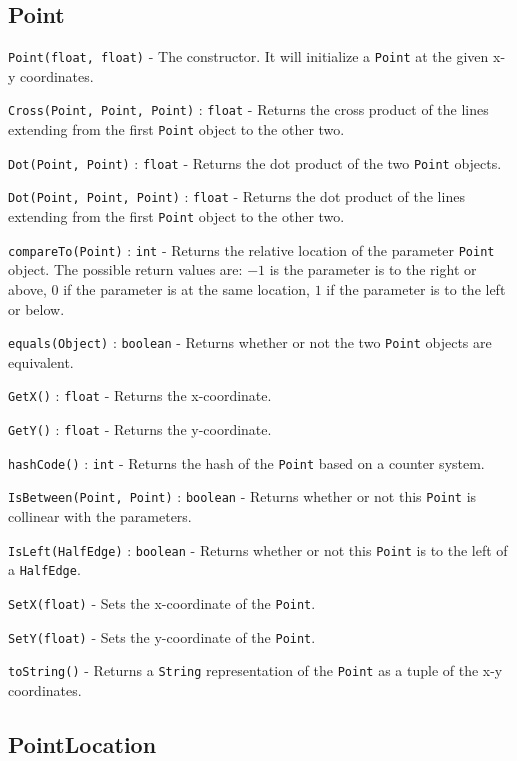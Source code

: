 \documentclass[11pt]{article}
\begin{document}
\subsection{Point}
\label{sec:point}

\texttt{Point(float, float)} - The constructor. It will initialize a \texttt{Point} at the given x-y coordinates.

\texttt{Cross(Point, Point, Point)} : \texttt{float} - Returns the cross product of the lines extending from the first \texttt{Point} object to the other two.

\texttt{Dot(Point, Point)}  : \texttt{float} - Returns the dot product of the two \texttt{Point} objects.

\texttt{Dot(Point, Point, Point)} : \texttt{float} - Returns the dot product of the lines extending from the first \texttt{Point} object to the other two.

\texttt{compareTo(Point)} : \texttt{int} - Returns the relative location of the parameter \texttt{Point} object. The possible return values are: $-1$ is the parameter is to the right or above, $0$ if the parameter is at the same location, $1$ if the parameter is to the left or below.

\texttt{equals(Object)} : \texttt{boolean} - Returns whether or not the two \texttt{Point} objects are equivalent.

\texttt{GetX()} : \texttt{float} - Returns the x-coordinate.

\texttt{GetY()} : \texttt{float} - Returns the y-coordinate.

\texttt{hashCode()} : \texttt{int} - Returns the hash of the \texttt{Point} based on a counter system.

\texttt{IsBetween(Point, Point)} : \texttt{boolean} - Returns whether or not this \texttt{Point} is collinear with the parameters.

\texttt{IsLeft(HalfEdge)} : \texttt{boolean} - Returns whether or not this \texttt{Point} is to the left of a \texttt{HalfEdge}.

\texttt{SetX(float)} - Sets the x-coordinate of the \texttt{Point}.

\texttt{SetY(float)} - Sets the y-coordinate of the \texttt{Point}.

\texttt{toString()} - Returns a \texttt{String} representation of the \texttt{Point} as a tuple of the x-y coordinates.

\subsection{PointLocation}
\label{sec:pointlocation}
\end{document}
